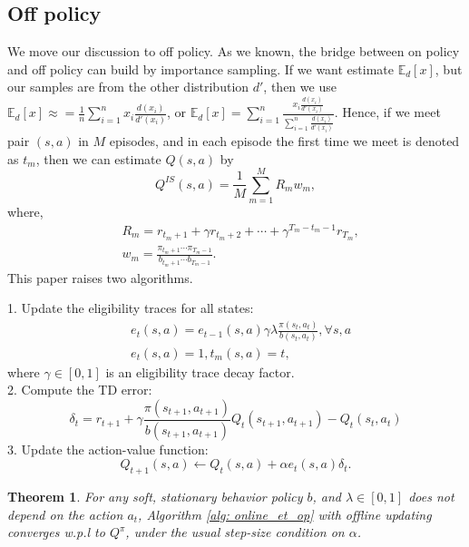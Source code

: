 \documentclass[11pt,a4paper]{article}
\def\E{\mathbb{E}}
\newtheorem{theorem}{Theorem}[subsection]
\begin{document}
\subsection{Off policy}
We move our discussion to off policy. As we known, the bridge between on policy and off policy can build by importance sampling. If we want estimate $\E_d[x]$, but our samples are from the other distribution $d'$, then we use $\E_d[x] \approx = \frac{1}{n}\sum_{i=1}^n x_i\frac{d(x_i)}{d'(x_i)}$, or $\E_d[x] = \sum_{i=1}^n \frac{x_i\frac{d(x_i)}{d'(x_i)}}{\sum_{i=1}^n \frac{d(x_i)}{d'(x_i)}}$. Hence, if we meet pair $(s,a)$ in $M$ episodes, and in each episode the first time we meet is denoted as $t_m$, then we can estimate $Q(s,a)$ by 
\begin{equation}
    Q^{IS}(s,a) = \frac{1}{M}\sum_{m=1}^M R_m w_m,
\end{equation}
where,
\begin{eqnarray}
    & R_m = r_{t_m + 1} + \gamma r_{t_m+2} + \cdots + \gamma^{T_m - t_m - 1} r_{T_m}, \\ 
    & w_m = \frac{\pi_{t_m+1} \cdots  \pi_{T_m-1}}{b_{t_m+1} \cdots b_{T_m-1}}.
\end{eqnarray}
This paper\cite{precup2000eligibility} raises two algorithms.
\begin{tcolorbox}[title=Online Eligibility-Trace Version of Per-Decision Importance Sampling]
\label{alg: online_et_op}
1. Update the eligibility traces for all states:
\begin{eqnarray}
& e_t(s,a) = e_{t-1}(s,a) \gamma\lambda \frac{\pi(s_t,a_t)}{b(s_t,a_t)}, \forall s, a \\ 
& e_t(s,a) = 1, t_m(s,a) = t,
\end{eqnarray}
where $\gamma \in [0,1]$ is an eligibility trace decay factor. \\ 
2. Compute the TD error:
\begin{equation}
\delta_t = r_{t+1} + \gamma \frac{\pi(s_{t+1},a_{t+1})}{b(s_{t+1},a_{t+1})} Q_t(s_{t+1}, a_{t+1}) - Q_t(s_t,a_t)
\end{equation}
3. Update the action-value function:
\begin{equation}
Q_{t+1}(s,a) \leftarrow Q_t(s,a) + \alpha e_t(s,a) \delta_t.
\end{equation}
\end{tcolorbox}
\begin{theorem}
\label{th:et_th1}
For any soft, stationary behavior policy $b$, and $\lambda \in [0,1]$ does not depend on the action $a_t$, Algorithm \ref{alg: online_et_op} with offline updating converges w.p.l to $Q^{\pi}$, under the usual step-size condition on $\alpha$.
\end{theorem}
\end{document}
